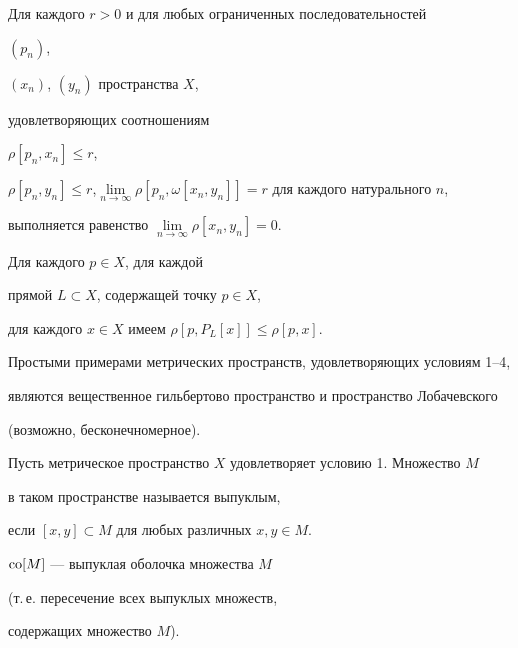 \begin{cond}


Для каждого $r>0$ и для любых ограниченных последовательностей


$(p_{n})$, \linebreak


$(x_{n})$, $(y_{n})$ пространства $X$, 


удовлетворяющих соотношениям 


$\rho [p_{n},x_{n}] \leq r$,


$\rho [p_{n},y_{n}] \leq r$,\linebreak $\lim \limits_{n \to 


\infty}{\rho[p_{n},\omega [x_{n},y_{n}]]}=r$ для каждого натурального $n$, 


выполняется равенство $\lim \limits_{n\to\infty}{\rho[x_{n},y_{n}]} = 0$.


\end{cond}





\begin{cond}


Для каждого $p \in X$, для каждой 


прямой $L \subset X$, содержащей точку $p \in X$,


для каждого $x \in X$ имеем $\rho [p,P_{L}[x]] \leq \rho [p,x]$.


\end{cond}





Простыми примерами метрических пространств, удовлетворяющих условиям 1--4,


являются вещественное гильбертово пространство и пространство Лобачевского


(возможно, бесконечномерное). 





Пусть метрическое пространство $X$ удовлетворяет условию 1. Множество $M$


в таком пространстве называется выпуклым, 


если $[x,y] \subset M$ для любых различных $x, y \in M$. 





$\operatorname{co}[M]$ --- выпуклая оболочка множества $M$


(т.\,е. пересечение всех выпуклых множеств,


содержащих множество $M$). 





